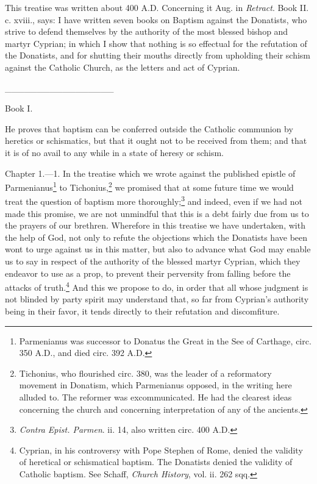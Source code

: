 
This treatise was written about 400 A.D. Concerning it Aug. in \emph{Retract}. Book II. c. xviii., says: I have written seven books on Baptism against the Donatists, who strive to defend themselves by the authority of the most blessed bishop and martyr Cyprian; in which I show that nothing is so effectual for the refutation of the Donatists, and for shutting their mouths directly from upholding their schism against the Catholic Church, as the letters and act of Cyprian.

\_\_\_\_\_\_\_\_\_\_\_\_\_\_\_\_\_


Book I.

He proves that baptism can be conferred outside the Catholic communion by heretics or schismatics, but that it ought not to be received from them; and that it is of no avail to any while in a state of heresy or schism.


Chapter 1.—1. In the treatise which we wrote against the published epistle of Parmenianus\footnote{\par  Parmenianus was successor to Donatus the Great in the See of Carthage, circ. 350  A.D., and died circ. 392  A.D.} to Tichonius,\footnote{\par  Tichonius, who flourished circ. 380, was the leader of a reformatory movement in Donatism, which Parmenianus opposed, in the writing here alluded to. The reformer was excommunicated. He had the clearest ideas concerning the church and concerning interpretation of any of the ancients.} we promised that at some future time we would treat the question of baptism more thoroughly;\footnote{\par  \emph{Contra Epist. Parmen}. ii. 14, also written circ. 400 A.D.} and indeed, even if we had not made this promise, we are not unmindful that this is a debt fairly due from us to the prayers of our brethren. Wherefore in this treatise we have undertaken, with the help of God, not only to refute the objections which the Donatists have been wont to urge against us in this matter, but also to advance what God may enable us to say in respect of the authority of the blessed martyr Cyprian, which they endeavor to use as a prop, to prevent their perversity from falling before the attacks of truth.\footnote{\par  Cyprian, in his controversy with Pope Stephen of Rome, denied the validity of heretical or schismatical baptism. The Donatists denied the validity of Catholic baptism. See Schaff, \emph{Church History}, vol. ii. 262 sqq.} And this we propose to do, in order that all whose judgment is not blinded by party spirit may understand that, so far from Cyprian’s authority being in their favor, it tends directly to their refutation and discomfiture.

